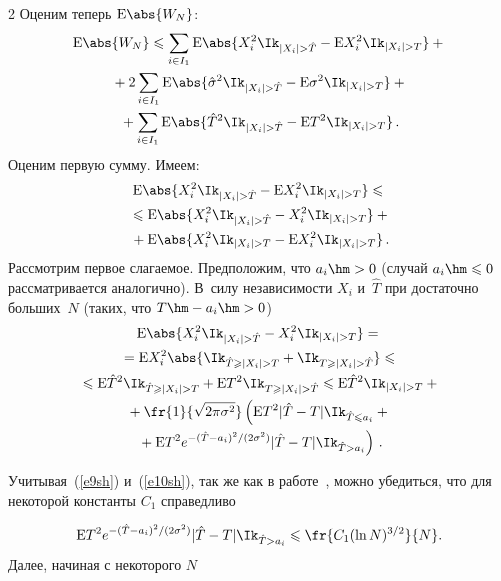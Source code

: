 \begin{multicols}{2}
Оценим теперь $\mbox{E}\abs{W_N}$:
\begin{multline}
\mbox{E}\abs{W_N}\leqslant\sum\limits_{i\in I_1}\mbox{E}\abs{X_i^2\Ik_{|X_i|> 
\hat{T}}-\mbox{E}X_i^2\Ik_{|X_i|> T}}+{}\\
{}+2\sum\limits_{i\in I_1}\mbox{E}\abs{\hat{\sigma}^2\Ik_{|X_i|> \hat{T}}-
\mbox{E}\sigma^2\Ik_{|X_i|> T}}+{}\\
{}+
\sum\limits_{i\in I_1}\mbox{E}\abs{\hat{T}^2\Ik_{|X_i|> \hat{T}}-\mbox{E}T^2\Ik_{|X_i|> T}}\,.
\label{e11sh}
\end{multline}
Оценим первую сумму. Имеем:
\begin{multline}
\mbox{E}\abs{X_i^2\Ik_{|X_i|> \hat{T}}-\mbox{E}X_i^2\Ik_{|X_i|> T}}\leqslant{}\\
{}\leqslant
\mbox{E}\abs{X_i^2\Ik_{|X_i|> \hat{T}}-X_i^2\Ik_{|X_i|> T}}+{}\\
{}+
\mbox{E}\abs{X_i^2\Ik_{|X_i|> T}-\mbox{E}X_i^2\Ik_{|X_i|> T}}\,.\label{e12sh}
\end{multline}
Рассмотрим первое слагаемое. Предположим, что $a_i\hm>0$ (случай $a_i\hm\leqslant0$ 
рассматривается аналогично). В~силу независимости $X_i$ и~$\hat{T}$ при достаточно больших~$N$ 
(таких, что $T\hm-a_i\hm>0$)
\begin{multline*}
\mbox{E}\abs{X_i^2\Ik_{|X_i|> \hat{T}}-X_i^2\Ik_{|X_i|> T}}={}\\
{}=
\mbox{E}X_i^2\abs{\Ik_{\hat{T}\geqslant|X_i|> T}+\Ik_{T\geqslant|X_i|> 
\hat{T}}}\leqslant{}\\
{}\leqslant\mbox{E}\hat{T}^2\Ik_{\hat{T}\geqslant|X_i|> T}+\mbox{E}T^2\Ik_{T\geqslant|X_i|> \hat{T}}\leqslant
\mbox{E}\hat{T}^2\Ik_{|X_i|> T}+{}\\
{}+
\fr{1}{\sqrt{2\pi\sigma^2}}\left(\mbox{E}T^2|\hat{T}-T|\Ik_{\hat{T}\leqslant 
a_i}+{}\right.\\
\left.{}+\mbox{E}T^2e^{-{(\hat{T}-a_i)^2}/(2\sigma^2)}|\hat{T}-T|\Ik_{\hat{T}>a_i}\right)\,.
\end{multline*}

Учитывая~(\ref{e9sh}) и~(\ref{e10sh}), так же как в работе~\cite{8sh}, 
можно убедиться, что для некоторой константы $C_1$ справедливо

\noindent
\begin{equation}
\hspace*{-1mm}\mbox{E}T^2e^{-{(\hat{T}-a_i)^2}/(2\sigma^2)}|\hat{T}-T|\Ik_{\hat{T}>a_i}\leqslant
\fr{C_1(\ln N)^{{3}/{2}}}{N}.\!\label{e13sh}
\end{equation}
Далее, начиная с некоторого $N$


\end{multicols}
